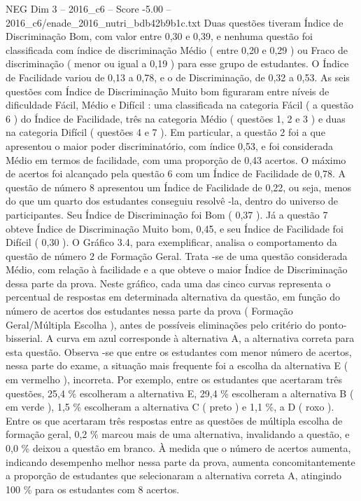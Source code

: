 \begin{textsample}{NEG Dim 3 – 2016\_c6 – Score -5.00 – 2016\_c6/enade\_2016\_nutri\_bdb42b9b1c.txt}
Duas questões tiveram Índice de Discriminação Bom, com valor entre 0,30 e 0,39, e nenhuma questão foi classificada com índice de discriminação Médio ( entre 0,20 e 0,29 ) ou Fraco de discriminação ( menor ou igual a 0,19 ) para esse grupo de estudantes.
O Índice de Facilidade variou de 0,13 a 0,78, e o de Discriminação, de 0,32 a 0,53.
As seis questões com Índice de Discriminação Muito bom figuraram entre níveis de dificuldade Fácil, Médio e Difícil : uma classificada na categoria Fácil ( a questão 6 ) do Índice de Facilidade, três na categoria Médio ( questões 1, 2 e 3 ) e duas na categoria Difícil ( questões 4 e 7 ).
Em particular, a questão 2 foi a que apresentou o maior poder discriminatório, com índice 0,53, e foi considerada Médio em termos de facilidade, com uma proporção de 0,43 acertos.
O máximo de acertos foi alcançado pela questão 6 com um Índice de Facilidade de 0,78.
A questão de número 8 apresentou um Índice de Facilidade de 0,22, ou seja, menos do que um quarto dos estudantes conseguiu resolvê -la, dentro do universo de participantes.
Seu Índice de Discriminação foi Bom ( 0,37 ).
Já a questão 7 obteve Índice de Discriminação Muito bom, 0,45, e seu Índice de Facilidade foi Difícil ( 0,30 ).
O Gráfico 3.4, para exemplificar, analisa o comportamento da questão de número 2 de Formação Geral.
Trata -se de uma questão considerada Médio, com relação à facilidade e a que obteve o maior Índice de Discriminação dessa parte da prova.
Neste gráfico, cada uma das cinco curvas representa o percentual de respostas em determinada alternativa da questão, em função do número de acertos dos estudantes nessa parte da prova ( Formação Geral/Múltipla Escolha ), antes de possíveis eliminações pelo critério do ponto-bisserial.
A curva em azul corresponde à alternativa A, a alternativa correta para esta questão.
Observa -se que entre os estudantes com menor número de acertos, nessa parte do exame, a situação mais frequente foi a escolha da alternativa E ( em vermelho ), incorreta.
Por exemplo, entre os estudantes que acertaram três questões, 25,4 \% escolheram a alternativa E, 29,4 \% escolheram a alternativa B ( em verde ), 1,5 \% escolheram a alternativa C ( preto ) e 1,1 \%, a D ( roxo ).
Entre os que acertaram três respostas entre as questões de múltipla escolha de formação geral, 0,2 \% marcou mais de uma alternativa, invalidando a questão, e 0,0 \% deixou a questão em branco.
À medida que o número de acertos aumenta, indicando desempenho melhor nessa parte da prova, aumenta concomitantemente a proporção de estudantes que selecionaram a alternativa correta A, atingindo 100 \% para os estudantes com 8 acertos.

\end{textsample}
